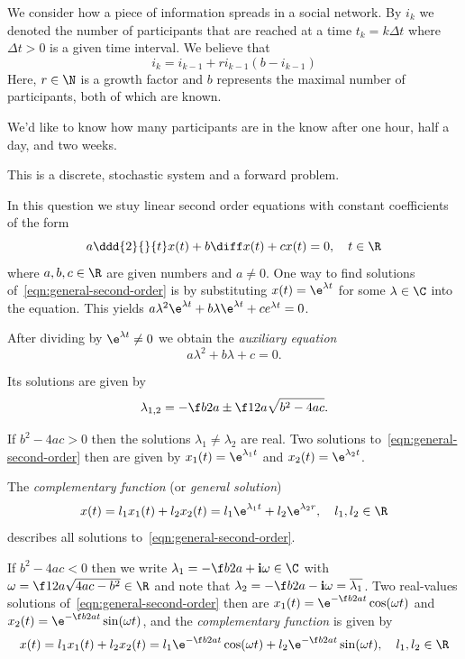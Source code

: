 \documentclass[a4paper]{article}
\begin{document}
\begin{questionbody}
We consider how a piece of information spreads in a social network. By $i_k$ we denoted the number of participants that are reached at a time $t_k = k \Delta t$ where $\Delta t > 0$ is a given time interval. We believe that \[
i_k = i_{k-1} + r i_{k-1} (b - i_{k-1})
\]
Here, $r \in \N$ is a growth factor and $b$ represents the maximal number of participants, both of which are known.

We'd like to know how many participants are in the know after one hour, half a day, and two weeks.
\end{questionbody}

This is a discrete, stochastic system and a forward problem.



\begin{questionbody}
In this question we stuy linear second order equations with constant coefficients of the form \begin{equation}
a \ddd{2}{}{t} x(t) + b \diff x(t) + c x(t) = 0, \quad t \in \R
\label{eqn:general-second-order}
\end{equation}
where $a, b, c \in \R$ are given numbers and $a \ne 0$. One way to find solutions of~\eqref{eqn:general-second-order} is by substituting $x(t) = \e^{\lambda t}$ for some $\lambda \in \C$ into the equation. This yields $a \lambda^2 \e^{\lambda t} + b \lambda \e^{\lambda t} + c e^{\lambda t} = 0$.

After dividing by $\e^{\lambda t} \ne 0$ we obtain the \textit{auxiliary equation} \[
a \lambda^2 + b \lambda + c = 0.
\]

Its solutions are given by \[
\lambda_{1,2} = -\f b{2a} \pm \f 1{2a} \sqrt{b^2 - 4ac}.
\]

If $b^2 - 4ac > 0$ then the solutions $\lambda_1 \ne \lambda_2$ are real. Two solutions to~\eqref{eqn:general-second-order} then are given by $x_1(t) = \e^{\lambda_1 t}$ and $x_2(t) = \e^{\lambda_2 t}$.

The \textit{complementary function} (or \textit{general solution}) \[
x(t) = l_1 x_1(t) + l_2 x_2(t) = l_1 \e^{\lambda_1 t} + l_2 \e^{\lambda_2 r}, \quad l_1, l_2 \in \R
\] describes all solutions to~\eqref{eqn:general-second-order}.

If $b^2 - 4ac < 0$ then we write $\lambda_1 = -\f b{2a} + \mathbf{i} \omega \in \C$ with $\omega = \f 1{2a} \sqrt{4ac - b^2} \in \R$ and note that $\lambda_2 = -\f b{2a} - \mathbf{i} \omega = \overline{\lambda_1}$.
Two real-values solutions of~\eqref{eqn:general-second-order} then are $x_1(t) = \e^{-\f b{2a} t} \cos(\omega t)$ and $x_2(t) = \e^{-\f b{2a} t} \sin(\omega t)$, and the \textit{complementary function} is given by \[
x(t) = l_1 x_1(t) + l_2 x_2(t) = l_1 \e^{-\f b{2a} t} \cos(\omega t) + l_2 \e^{-\f b{2a} t} \sin(\omega t), \quad l_1, l_2 \in \R
\]
\end{questionbody}
\end{document}
